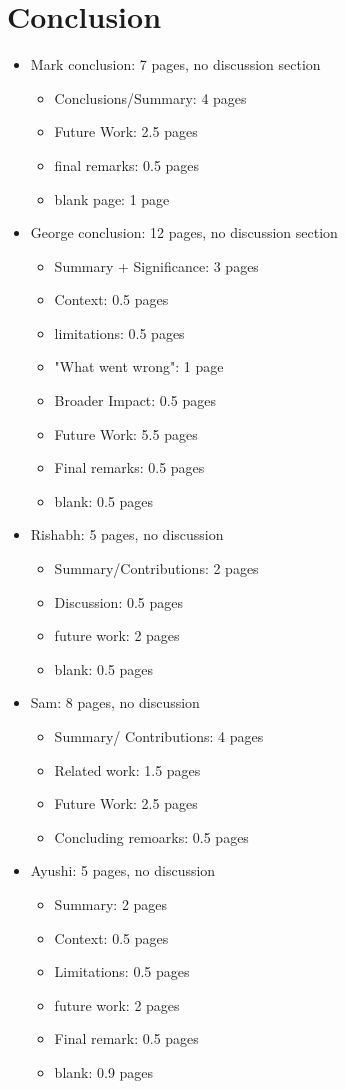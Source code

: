 \chapter{Conclusion}\label{Chapter6}
\iffalse
\begin{itemize}
    \item Mark conclusion: 7 pages, no discussion section
    \begin{itemize}
        \item Conclusions/Summary: 4 pages
        \item Future Work: 2.5 pages
        \item final remarks: 0.5 pages
        \item blank page: 1 page
    \end{itemize}
    \item George conclusion: 12 pages, no discussion section
    \begin{itemize}
        \item Summary + Significance: 3 pages
        \item Context: 0.5 pages
        \item limitations: 0.5 pages
        \item "What went wrong": 1 page
        \item Broader Impact: 0.5 pages
        \item Future Work: 5.5 pages
        \item Final remarks: 0.5 pages
        \item blank: 0.5 pages
    \end{itemize}
    \item Rishabh: 5 pages, no discussion
    \begin{itemize}
        \item Summary/Contributions: 2 pages
        \item Discussion: 0.5 pages
        \item future work: 2 pages
        \item blank: 0.5 pages
    \end{itemize}
    \item Sam: 8 pages, no discussion
    \begin{itemize}
        \item Summary/ Contributions: 4 pages
        \item Related work: 1.5 pages
        \item Future Work: 2.5 pages
        \item Concluding remoarks: 0.5 pages
    \end{itemize}
    \item Ayushi: 5 pages, no discussion
    \begin{itemize}
        \item Summary: 2 pages
        \item Context: 0.5 pages
        \item Limitations: 0.5 pages
        \item future work: 2 pages
        \item Final remark: 0.5 pages
        \item blank: 0.9 pages
    \end{itemize}
\end{itemize}
